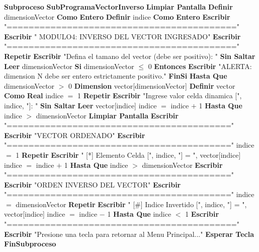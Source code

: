 \documentclass[12pt,a4paper]{article}
\newcommand{\kw}[1]{\textcolor{pseKeyword}{\textbf{#1}}}
\newcommand{\txt}[1]{\textcolor{pseString}{"#1"}}
\newcommand{\num}[1]{\textcolor{pseNumber}{#1}}
\newcommand{\opAsig}{\textcolor{pseKeyword}{$=$}}
\newcommand{\opMas}{\textcolor{pseKeyword}{$+$}}
\newcommand{\opMenos}{\textcolor{pseKeyword}{$-$}}
\newcommand{\opMayor}{\textcolor{pseKeyword}{$>$}}
\newcommand{\opMenor}{\textcolor{pseKeyword}{$<$}}
\newcommand{\opMenorIgual}{\textcolor{pseKeyword}{$\leq$}}
\newcommand{\Asignacion}[2]{#1\; \opAsig\; #2}
\newcommand{\Escribir}[1]{\kw{Escribir} #1}
\newcommand{\EscribirSS}[1]{\kw{Escribir} #1 \kw{Sin Saltar}}
\newcommand{\Leer}[1]{\kw{Leer} #1}
\newcommand{\Definir}[2]{\kw{Definir} #1 \kw{Como} \kw{#2}}
\newcommand{\Si}[1]{\kw{Si} #1 \kw{Entonces}}
\newcommand{\FinSi}{\kw{FinSi}}
\newcommand{\Repetir}{\kw{Repetir}}
\newcommand{\HastaQue}[1]{\kw{Hasta Que} #1}
\newcommand{\Subproceso}[1]{\kw{Subproceso} \textbf{#1}}
\newcommand{\FinSubproceso}{\kw{FinSubproceso}}
\newcommand{\Dimension}[1]{\kw{Dimension} #1}
\newcommand{\I}{\hspace{1.5em}}
\newcommand{\II}{\hspace{3.0em}}
\newcommand{\III}{\hspace{4.5em}}
\begin{document}
\begin{algorithmic}[1]
		\State \Subproceso{SubProgramaVectorInverso}
		\State \I \kw{Limpiar Pantalla}
		\State \I \Definir{dimensionVector}{Entero}
		\State \I \Definir{indice}{Entero}
		\State
		\State \I \Escribir{\txt{==========================================}}
		\State \I \Escribir{\txt{ MODULO4: INVERSO DEL VECTOR INGRESADO}}
		\State \I \Escribir{\txt{==========================================}}
		\State
		\State \I \Repetir
		\State \II \EscribirSS{\txt{Defina el tamano del vector (debe ser positivo): }}
		\State \II \Leer{dimensionVector}
		\State \II \Si{dimensionVector \opMenorIgual{} \num{0}}
		\State \III \Escribir{\txt{ALERTA: dimension N debe ser entero estrictamente positivo.}}
		\State \II \FinSi
		\State \I \HastaQue{dimensionVector \opMayor{} \num{0}}
		\State
		\State \I \Dimension{vector[dimensionVector]}
		\State \I \Definir{vector}{Real}
		\State
		\State \I \Asignacion{indice}{\num{1}}
		\State \I \Repetir
		\State \II \EscribirSS{\txt{Ingrese valor celda dinamica [}, indice, \txt{]: }}
		\State \II \Leer{vector[indice]}
		\State \II \Asignacion{indice}{indice \opMas{} \num{1}}
		\State \I \HastaQue{indice \opMayor{} dimensionVector}
		\State
		\State \I \kw{Limpiar Pantalla}
		\State \I \Escribir{\txt{=========================================}}
		\State \I \Escribir{\txt{VECTOR ORDENADO}}
		\State \I \Escribir{\txt{=========================================}}
		\State \I \Asignacion{indice}{\num{1}}
		\State \I \Repetir
		\State \II \Escribir{\txt{  [*] Elemento Celda [}, indice, \txt{] = }, vector[indice]}
		\State \II \Asignacion{indice}{indice \opMas{} \num{1}}
		\State \I \HastaQue{indice \opMayor{} dimensionVector}
		\State
		\State \I \Escribir{\txt{=========================================}}
		\State \I \Escribir{\txt{ORDEN INVERSO DEL VECTOR}}
		\State \I \Escribir{\txt{=========================================}}
		\State \I \Asignacion{indice}{dimensionVector}
		\State \I \Repetir
		\State \II \Escribir{\txt{  [\#] Indice Invertido [}, indice, \txt{] = }, vector[indice]}
		\State \II \Asignacion{indice}{indice \opMenos{} \num{1}}
		\State \I \HastaQue{indice \opMenor{} \num{1}}
		\State \I \Escribir{\txt{==========================================}}
		\State \I \Escribir{\txt{Presione una tecla para retornar al Menu Principal...}}
		\State \I \kw{Esperar Tecla}
		\State \FinSubproceso
	\end{algorithmic}
	
	
	
	
	
\end{document}
